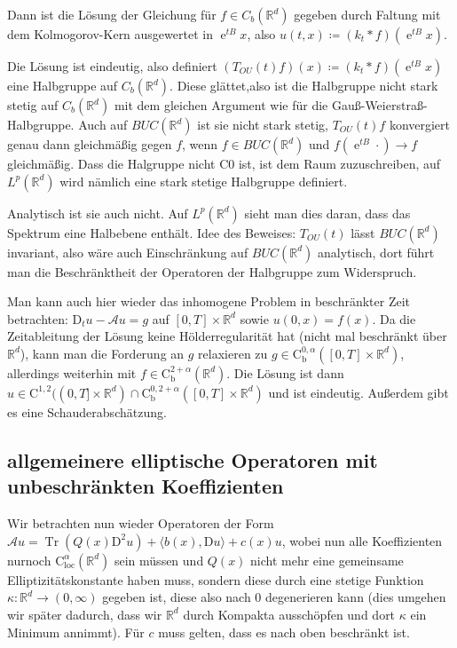 \documentclass[11pt,a4paper]{scrartcl}
\newcommand{\R}{\mathbb{R}} %
\newcommand{\A}{\mathcal{A}}
\newcommand{\Cb}{\mathrm{C}_\mathrm{b}}
\theoremstyle{plain}
\theoremstyle{definition}
\theoremstyle{remark}
\DeclareMathOperator{\Tr}{Tr}
\DeclareMathOperator{\e}{e}
\begin{document}
Dann ist die Lösung der Gleichung für $f\in C_b(\R^d)$ gegeben durch Faltung mit dem Kolmogorov-Kern ausgewertet in $\e^{tB}x$, also $u(t,x)\coloneqq (k_t\ast f)(\e^{tB}x)$.

Die Lösung ist eindeutig, also definiert $(T_{OU}(t)f)(x)\coloneqq (k_t\ast f)(\e^{tB}x)$ eine Halbgruppe auf $C_b(\R^d)$. Diese glättet,also ist die Halbgruppe nicht stark stetig auf $C_b(\R^d)$ mit dem gleichen Argument wie für die Gauß-Weierstraß-Halbgruppe. Auch auf $BUC(\R^d)$ ist sie nicht stark stetig, $T_{OU}(t)f$ konvergiert genau dann gleichmäßig gegen $f$, wenn $f\in BUC(\R^d)$ und $f(\e^{tB}\cdot)\to f$ gleichmäßig. Dass die Halgruppe nicht C0 ist, ist dem Raum zuzuschreiben, auf $L^p(\R^d)$ wird nämlich eine stark stetige Halbgruppe definiert.

Analytisch ist sie auch nicht. Auf $L^p(\R^d)$ sieht man dies daran, dass das Spektrum eine Halbebene enthält. Idee des Beweises: $T_{OU}(t)$ lässt $BUC(\R^d)$ invariant, also wäre auch Einschränkung auf $BUC(\R^d)$ analytisch, dort führt man die Beschränktheit der Operatoren der Halbgruppe zum Widerspruch.

Man kann auch hier wieder das inhomogene Problem in beschränkter Zeit betrachten: $\mathrm{D}_t u -\A u = g$ auf $[0,T]\times \R^d$ sowie $u(0,x)=f(x)$. Da die Zeitableitung der Lösung keine Hölderregularität hat (nicht mal beschränkt über $\R^d$), kann man die Forderung an $g$ relaxieren zu $g\in \Cb^{0,\alpha}([0,T]\times \R^d)$, allerdings weiterhin mit $f\in \Cb^{2+\alpha}(\R^d)$. Die Lösung ist dann $u\in \mathrm{C}^{1,2}((0,T]\times \R^d)\cap \Cb^{0,2+\alpha}([0,T]\times \R^d)$ und ist eindeutig. Außerdem gibt es eine Schauderabschätzung. 

\subsection{allgemeinere elliptische Operatoren mit unbeschränkten Koeffizienten}

Wir betrachten nun wieder Operatoren der Form $\A u = \Tr(Q(x)\mathrm{D}^2u)+\langle b(x), \mathrm{D}u\rangle + c(x)u$, wobei nun alle Koeffizienten nurnoch $\mathrm{C}_\mathrm{loc}^\alpha(\R^d)$ sein müssen und $Q(x)$ nicht mehr eine gemeinsame Elliptizitätskonstante haben muss, sondern diese durch eine stetige Funktion $\kappa: \R^d\to (0,\infty)$ gegeben ist, diese also nach $0$ degenerieren kann (dies umgehen wir später dadurch, dass wir $\R^d$ durch Kompakta ausschöpfen und dort $\kappa$ ein Minimum annimmt). Für $c$ muss gelten, dass es nach oben beschränkt ist. 
\end{document}
